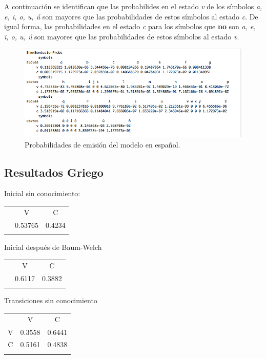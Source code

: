 \documentclass[]{article}
\begin{document}
A continuación se identifican que las probabilides en el estado \emph{v}
de los símbolos \emph{a, e, i, o, u, ú} son mayores que las
probabilidades de estos símbolos al estado \emph{c}. De igual forma, las
probabilidades en el estado \emph{c} para los símbolos que \textbf{no}
son \emph{a, e, i, o, u, ú} son mayores que las probabilidades de estos
símbolos al estado \emph{v}.

\begin{figure}[htbp]
\centering
\includegraphics{salida_vocales.png}
\caption{Probabilidades de emisión del modelo en español.}
\end{figure}

\subsection{Resultados Griego}\label{resultados-griego}

Inicial sin conocimiento:

\begin{longtable}[c]{@{}ccc@{}}
\toprule\addlinespace
& V & C
\\\addlinespace
\midrule\endhead
& 0.53765 & 0.4234
\\\addlinespace
\bottomrule
\end{longtable}

Inicial después de Baum-Welch

\begin{longtable}[c]{@{}ccc@{}}
\toprule\addlinespace
& V & C
\\\addlinespace
\midrule\endhead
& 0.6117 & 0.3882
\\\addlinespace
\bottomrule
\end{longtable}

Transiciones sin conocimiento

\begin{longtable}[c]{@{}ccc@{}}
\toprule\addlinespace
& V & C
\\\addlinespace
\midrule\endhead
V & 0.3558 & 0.6441
\\\addlinespace
C & 0.5161 & 0.4838
\\\addlinespace
\bottomrule
\end{longtable}
\end{document}

